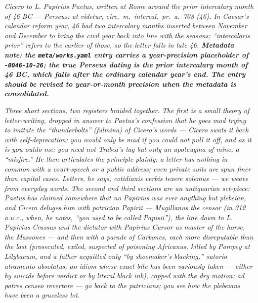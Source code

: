 
\textit{Cicero to L. Papirius Paetus, written at Rome around the
prior intercalary month of 46 BC --- Perseus: \textit{ut videtur,
circ.~m.~intercal.~pr.~a.~708 (46)}. In Caesar's calendar
reform year, 46 had two intercalary months inserted between
November and December to bring the civil year back into line
with the seasons; ``intercalaris prior'' refers to the earlier
of those, so the letter falls in late 46. \textbf{Metadata note:
the \texttt{meta/works.yaml} entry carries a year-precision
placeholder of \texttt{-0046-10-26}; the true Perseus dating is
the prior intercalary month of 46 BC, which falls after the
ordinary calendar year's end. The entry should be revised to
year-or-month precision when the metadata is consolidated.}}

\textit{Three short sections, two registers braided together. The
first is a small theory of letter-writing, dropped in answer to
Paetus's confession that he goes mad trying to imitate the
``thunderbolts'' (\textit{fulmina}) of Cicero's words --- Cicero
swats it back with self-deprecation: you would only be mad if you
could \emph{not} pull it off, and as it is you outdo me; you
need not Trabea's tag but only an \textit{apoteugma} of mine, a
``misfire.'' He then articulates the principle plainly: a letter
has nothing in common with a court-speech or a public address;
even private suits are spun finer than capital cases. Letters,
he says, \textit{cotidianis verbis texere solemus} --- we weave
from everyday words. The second and third sections are an
antiquarian set-piece: Paetus has claimed somewhere that no
Papirius was ever anything but plebeian, and Cicero deluges him
with patrician Papirii --- Mugillanus the censor (in 312 a.u.c.,
when, he notes, ``you used to be called Papisii''), the line
down to L. Papirius Crassus and the dictator with Papirius
Cursor as master of the horse, the Massones --- and then with a
parade of Carbones, each more disreputable than the last
(prosecuted, exiled, suspected of poisoning Africanus, killed by
Pompey at Lilybaeum, and a father acquitted only ``by shoemaker's
blacking,'' \textit{sutorio atramento absolutus}, an idiom whose
exact bite has been variously taken --- either by suicide before
verdict or by literal black ink), capped with the dry motion:
\textit{ad patres censeo revertare} --- go back to the
patricians; you see how the plebeians have been a graceless lot.}
